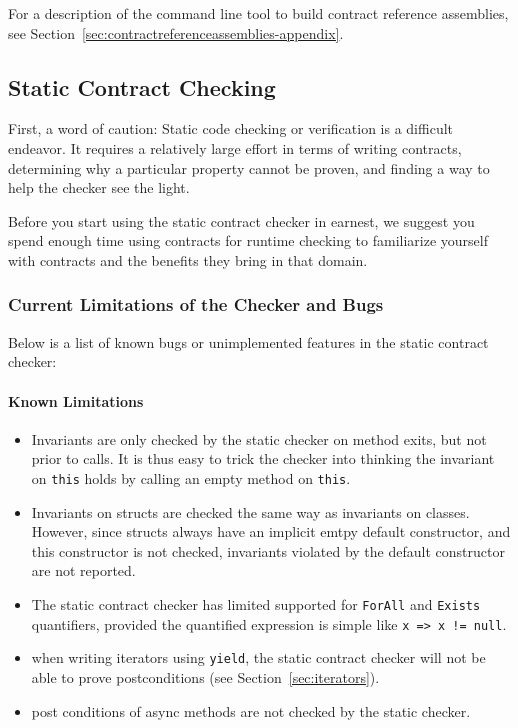 \documentclass{article}
\newcommand{\code}[1]{\lstinline{#1}}
\begin{document}
\noindent
For a description of the command line tool to build contract reference
assemblies, see
Section~\ref{sec:contractreferenceassemblies-appendix}.

\subsection{Static Contract Checking}
\label{sec:staticchecker}
First, a word of caution: Static code checking or verification is a
difficult endeavor. It requires a relatively large effort in terms of
writing contracts, determining why a particular property cannot be
proven, and finding a way to help the checker see the light.

Before you start using the static contract checker in earnest, we
suggest you spend enough time using contracts for runtime checking to
familiarize yourself with contracts and the benefits they bring in
that domain.

\subsubsection{Current Limitations of the Checker and Bugs}
Below is a list of known bugs or unimplemented features in the static
contract checker:
\paragraph{Known Limitations}
\begin{itemize}
\item Invariants are only checked by the static checker on method
  exits, but not prior to calls. It is thus easy to trick the checker
  into thinking the invariant on \code{this} holds by calling an empty
  method on \code{this}.

\item Invariants on structs are checked the same way as invariants on
  classes. However, since structs always have an implicit emtpy default
  constructor, and this constructor is not checked, invariants
  violated by the default constructor are not reported.

\item The static contract checker has limited supported for
  \code{ForAll} and \code{Exists} quantifiers, provided the quantified expression is
  simple like \code{x => x != null}.

\item when writing iterators using 
  \code{yield}, the static contract checker will not be able to
  prove postconditions (see Section~\ref{sec:iterators}).

\item post conditions of async methods are not checked by the static checker.
\end{itemize}
\end{document}
